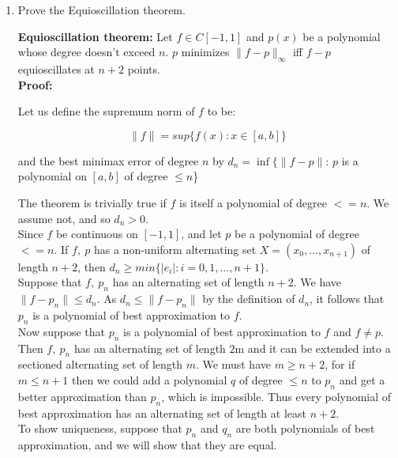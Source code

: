 \documentclass{article}
\begin{document}
\begin{enumerate}
\item Prove the Equioscillation theorem.

\textbf{Equioscillation theorem:} Let $f \in C[-1,1]$ and $p(x)$ be a polynomial whose
degree doesn't exceed $n$. $p$ minimizes $\lVert f-p \rVert_{\infty}$ iff $f-p$ 
equioscillates at $n+2$ points. \\

\textbf{Proof:}

Let us define the supremum norm of $f$ to be:

\begin{equation*}
\lVert f \rVert = sup \{f(x): x \in [a, b] \}
\end{equation*}

and the best minimax error of degree $n$ by
$d_{n} = \inf\{ \lVert f - p \rVert $: $p$ is a polynomial on $[a,b]$ of degree $\leq n$\}


The theorem is trivially true if $f$ is itself a polynomial of degree $<= n$. We assume
not, and so $d_{n} > 0$. \\

Since $f$ be continuous on $[-1, 1]$, and let $p$ be a polynomial of degree $<= n$. If $f,
\ p$ has a non-uniform alternating set $X = (x_{0},...,x_{n+1})$ of length $n+2$, then 
$d_{n} \geq min \{|e_{i}|: i = 0, 1, ..., n+1 \}$. \\

Suppose that $f,\ p_{n}$ has an alternating set of length $n+2$.
We have $\lVert f - p_{n} \rVert \leq d_{n}$. As $d_{n} \leq \lVert f - p_{n} \rVert$ by
the definition of $d_{n}$, it follows that $p_{n}$ is a polynomial of best approximation 
to $f$. \\

Now suppose that $p_{n}$ is a polynomial of best approximation to $f$ and $f \neq p$. Then
$f,\ p_{n}$ has an alternating set of length $2$m and it can be extended into a sectioned
alternating set of length $m$. We must have $m \geq n + 2$, for if $m \leq n+1$ then we
could add a polynomial $q$ of degree $\leq n$ to $p_{n}$ and get a better approximation
than $p_{n}$, which is impossible. Thus every polynomial of best approximation has an
alternating set of length at least $n + 2$. \\

To show uniqueness, suppose that $p_{n}$ and $q_{n}$ are both polynomials of best
approximation, and we will show that they are equal. \\


\end{enumerate}
\end{document}

